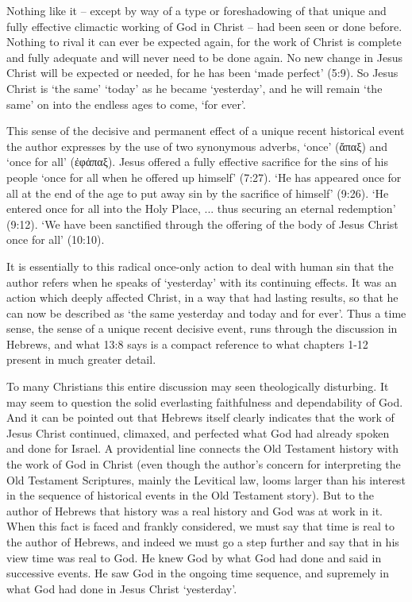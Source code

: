Nothing like it -- except by way of a type or foreshadowing of that unique and
fully effective climactic working of God in Christ -- had been seen or done
before.
Nothing to rival it can ever be expected again, for the work of Christ is
complete and fully adequate and will never need to be done again.
No new change in Jesus Christ will be expected or needed, for he has been `made
perfect' (5:9).
So Jesus Christ is `the same' `today' as he became `yesterday', and he will
remain `the same' on into the endless ages to come, `for ever'.
\newline

This sense of the decisive and permanent effect of a unique recent historical
event the author expresses by the use of two synonymous adverbs, `once'
(ἄπαξ) and `once for all' (ἐφἀπαξ).
Jesus offered a fully effective sacrifice for the sins of his people `once for
all when he offered up himself' (7:27).
`He has appeared once for all at the end of the age to put away sin by the
sacrifice of himself' (9:26).
`He entered once for all into the Holy Place, ... thus securing an eternal
redemption' (9:12).
`We have been sanctified through the offering of the body of Jesus Christ once
for all' (10:10).
\newline

It is essentially to this radical once-only action to deal with human sin that
the author refers when he speaks of `yesterday' with its continuing effects.
It was an action which deeply affected Christ, in a way that had lasting
results, so that he can now be described as `the same yesterday and today and
for ever'.
Thus a time sense, the sense of a unique recent decisive event, runs through the
discussion in Hebrews, and what 13:8 says is a compact reference to what
chapters 1-12 present in much greater detail.
\newline

To many Christians this entire discussion may seen theologically disturbing.
It may seem to question the solid everlasting faithfulness and dependability of
God.
And it can be pointed out that Hebrews itself clearly indicates that the work of
Jesus Christ continued, climaxed, and perfected what God had already spoken and
done for Israel.
A providential line connects the Old Testament history with the work of God in
Christ (even though the author's concern for interpreting the Old Testament
Scriptures, mainly the Levitical law, looms larger than his interest in the
sequence of historical events in the Old Testament story).
But to the author of Hebrews that history was a real history and God was at work
in it.
When this fact is faced and frankly considered, we must say that time is real to
the author of Hebrews, and indeed we must go a step further and say that in his
view time was real to God.
He knew God by what God had done and said in successive events.
He saw God in the ongoing time sequence, and supremely in what God had done in
Jesus Christ `yesterday'.

